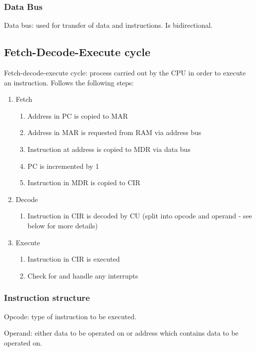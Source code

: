 \documentclass[a4paper]{report}
\begin{document}
\subsubsection{Data Bus}

Data bus: used for transfer of data and instructions. Is bidirectional.

\subsection{Fetch-Decode-Execute cycle}

Fetch-decode-execute cycle: process carried out by the CPU in order to execute
an instruction. Follows the following steps:

\begin{enumerate}
	\item{Fetch}
		\begin{enumerate}
			\item{Address in PC is copied to MAR}
			\item{Address in MAR is requested from RAM via address
				bus}
			\item{Instruction at address is copied to MDR via data
				bus}
			\item{PC is incremented by 1}
			\item{Instruction in MDR is copied to CIR}
		\end{enumerate}
	\item{Decode}
		\begin{enumerate}
			\item{Instruction in CIR is decoded by CU (split into
				opcode and operand - see below for more
				details)}
		\end{enumerate}
	\item{Execute}
		\begin{enumerate}
			\item{Instruction in CIR is executed}
			\item{Check for and handle any interrupts}
		\end{enumerate}
\end{enumerate}

\subsubsection{Instruction structure}

Opcode: type of instruction to be executed.

Operand: either data to be operated on or address which contains data to be
operated on.
\end{document}
